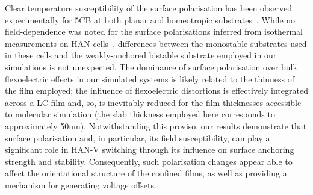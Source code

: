 \documentclass[aps,10pt,twocolumn]{revtex4}
\begin{document}
Clear temperature susceptibility of the surface polarisation has been observed experimentally for 5CB at both
planar and homeotropic substrates~\cite{Blinov:2001.183}. While no field-dependence was noted for the surface
polarisations inferred from isothermal measurements on HAN cells~\cite{Mazzulla:2001:021708}, differences between
the monostable substrates used in these cells and the weakly-anchored bistable substrate employed in our
simulations is not unexpected. The dominance of surface polarisation over bulk flexoelectric effects in our
simulated systems is likely related to the thinness of the film employed; the influence of flexoelectric
distortions is effectively integrated across a LC film and, so, is inevitably reduced for the film thicknesses
accessible to molecular simulation (the slab thickness employed here corresponds to approximately 50nm).
Notwithstanding this proviso, our results demonstrate that surface polarisation and, in particular, its field
susceptibility, can play a significant role in HAN-V switching through its influence on surface anchoring strength
and stability. Consequently, such polarisation changes appear able to affect the orientational structure of the
confined films, as well as providing a mechanism for generating voltage offsets.
\end{document}
